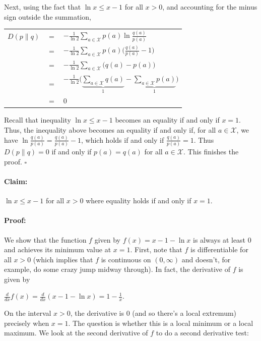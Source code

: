 \documentclass[6008notes.tex]{subfiles}
\begin{document}
Next, using the fact that $\ln x\le x-1$ for all $x>0$, and accounting for the minus sign outside the summation,

{\renewcommand{\arraystretch}{1.5}
\begin{tabular}{l l l}
$D(p\parallel q)$ & $=$ & $-\frac{1}{\ln 2}\sum _{a\in \mathcal{X}}p(a)\ln \frac{q(a)}{p(a)}$ \\
  & $=$ & $-\frac{1}{\ln 2}\sum _{a\in \mathcal{X}}p(a)\Big(\frac{q(a)}{p(a)}-1\Big)$ \\
  & $=$ & $-\frac{1}{\ln 2}\sum _{a\in \mathcal{X}}\big (q(a)-p(a)\big )$ \\
  & $=$ & $-\frac{1}{\ln 2}\big (\underbrace{\sum _{a\in \mathcal{X}}q(a)}_{1}-\underbrace{\sum _{a\in \mathcal{X}}p(a)}_{1}\big )$ \\
  & $=$ & $0$ 
\end{tabular}}
			
Recall that inequality $\ln x\le x-1$ becomes an equality if and only if $x=1$. Thus, the inequality above becomes an equality if and only if, for all $a\in \mathcal{X}$, we have $\ln \frac{q(a)}{p(a)}=\frac{q(a)}{p(a)}-1$, which holds if and only if $\frac{q(a)}{p(a)}=1$. Thus $D(p\parallel q)=0$ if and only if $p(a)=q(a)$ for all $a\in \mathcal{X}$. This finishes the proof. $\square$

\paragraph{Claim:} $\ln x\le x-1$ for all $x>0$ where equality holds if and only if $x=1$.

\paragraph{Proof:} We show that the function $f$ given by $f(x)=x-1-\ln x$ is always at least 0 and achieves its minimum value at $x=1$. First, note that $f$ is differentiable for all $x>0$ (which implies that $f$ is continuous on $(0,\infty)$ and doesn't, for example, do some crazy jump midway through). In fact, the derivative of $f$ is given by

{\centering$\frac{d}{dx}f(x)=\frac{d}{dx}(x-1-\ln x)=1-\frac{1}{x}.$ \par}
 
On the interval $x>0$, the derivative is 0 (and so there's a local extremum) precisely when $x=1$. The question is whether this is a local minimum or a local maximum. We look at the second derivative of $f$ to do a second derivative test:
\end{document}
